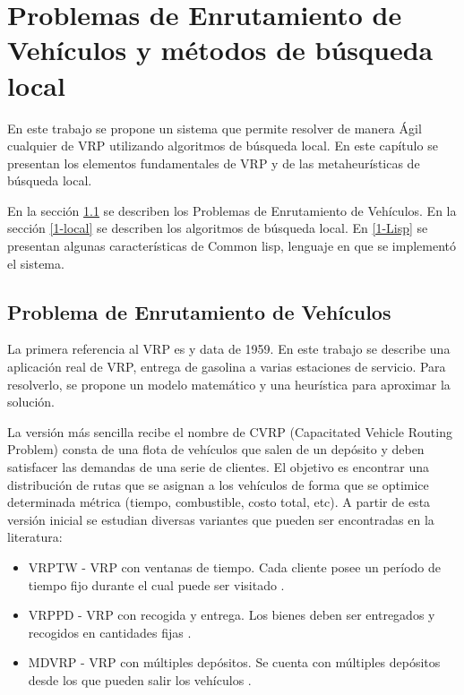 \chapter{Problemas de Enrutamiento de Vehículos y métodos de búsqueda local}\label{chapter: VRP}

En este trabajo se propone un sistema que permite resolver de manera Ágil cualquier de VRP utilizando algoritmos de búsqueda local. En este capítulo se presentan los elementos fundamentales de VRP y de las metaheurísticas de búsqueda local.

En la sección \ref{1-VRPintro} se describen los Problemas de Enrutamiento de Vehículos. En la sección \ref{1-local} se describen los algoritmos de búsqueda local. En \ref{1-Lisp} se presentan algunas características de Common lisp, lenguaje en que se implementó el sistema.


\section{Problema de Enrutamiento de Vehículos}\label{1-VRPintro}
La primera referencia al VRP es \cite{CVRP} y data de 1959. En este trabajo se describe una aplicación real de VRP, entrega de gasolina a varias estaciones de servicio. Para resolverlo, se propone un modelo matemático y una heurística para aproximar la solución.

La versión más sencilla recibe el nombre de CVRP (Capacitated Vehicle Routing Problem) \cite{CVRP} consta de una flota de vehículos que salen de un depósito y deben satisfacer las demandas de una serie de clientes. El objetivo es encontrar una distribución de rutas que se asignan a los vehículos de forma que se optimice determinada métrica (tiempo, combustible, costo total, etc). A partir de esta versión inicial se estudian diversas variantes que pueden ser encontradas en la literatura:

\begin{itemize}
	\item VRPTW - VRP con ventanas de tiempo. Cada cliente posee un período de tiempo fijo durante el cual puede ser visitado \cite{TODO}.
	\item VRPPD - VRP con recogida y entrega. Los bienes deben ser entregados y recogidos en cantidades fijas \cite{TODO}.
	\item MDVRP - VRP con múltiples depósitos. Se cuenta con múltiples depósitos desde los que pueden salir los vehículos \cite{TODO}.
\end{itemize}

